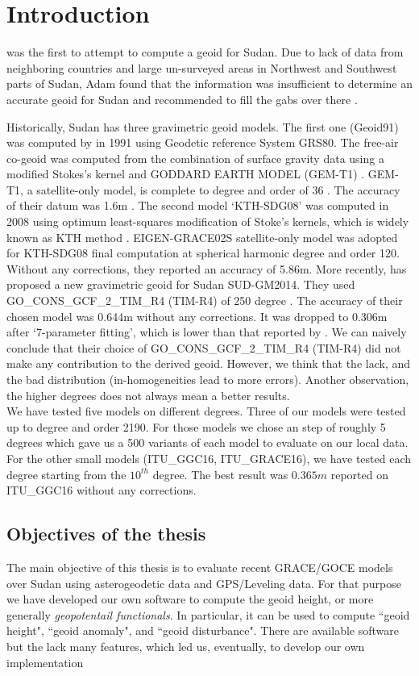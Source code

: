 \chapter{Introduction}

\cite{osman} was the first to attempt to compute a geoid for Sudan. Due to lack of data from neighboring countries and large un-surveyed areas in Northwest and Southwest parts of Sudan, Adam found that the information was insufficient to determine an accurate geoid for Sudan and recommended to fill the gabs over there \cite{ahmed_msc}. 

Historically, Sudan has three gravimetric geoid models. The first one (Geoid91) was computed by \cite{fashir} in 1991 using Geodetic reference System GRS80. The free-air co-geoid was computed from the combination of surface gravity data using a modified Stokes's kernel and GODDARD EARTH MODEL (GEM-T1)  \cite{fashir}. GEM-T1, a satellite-only model, is complete to degree and order of 36 \cite{nasa}. The accuracy of their datum was 1.6m \cite{fashir, godah}. The second model `KTH-SDG08' was computed in 2008 using optimum least-squares modification of Stoke's kernels, which is widely known as KTH method \cite{ahmed_msc}. EIGEN-GRACE02S satellite-only model was adopted for KTH-SDG08 final computation at spherical harmonic degree and order 120. Without any corrections, they reported an accuracy of 5.86m.
More recently, \citep{godah} has proposed a new gravimetric geoid for Sudan SUD-GM2014. They used GO\_CONS\_GCF\_2\_TIM\_R4 (TIM-R4) of 250 degree \cite{pail}. The accuracy of their chosen model was 0.644m without any corrections. It was dropped to 0.306m after `7-parameter fitting', which is lower than that reported by \citep{ahmed_msc}. We can naively conclude that their choice of GO\_CONS\_GCF\_2\_TIM\_R4 (TIM-R4) did not make any contribution to the derived geoid. However, we think that the lack, and the bad distribution (in-homogeneities lead to more errors). Another observation, the higher degrees does not always mean a better results.
\\
We have tested five models on different degrees. Three of our models were tested up to degree and order 2190. For those models we chose an step of roughly 5 degrees which gave us a 500 variants of each model to evaluate on our local data. For the other small models (ITU\_GGC16, ITU\_GRACE16), we have tested each degree starting from the $10^{th}$ degree. The best result was $0.365m$ reported on ITU\_GGC16 without any corrections. 

\section{Objectives of the thesis}
The main objective of this thesis is to evaluate recent GRACE/GOCE models over Sudan using asterogeodetic data and GPS/Leveling data. For that purpose we have developed our own software to compute the geoid height, or more generally \textit{geopotentail functionals}. In particular, it can be used to compute ``geoid height", ``geoid anomaly", and ``geoid disturbance". There are available software but the lack many features, which led us, eventually, to develop our own implementation

